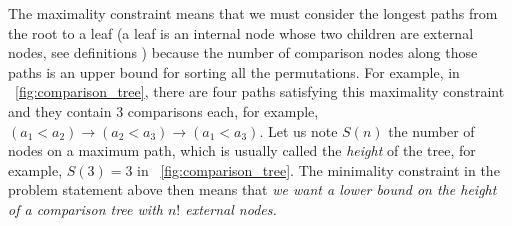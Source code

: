 The maximality constraint means that we must consider the longest
paths from the root to a leaf (a leaf is an internal node whose two
children are external nodes, see definitions )
because the number of comparison nodes along those paths is an upper
bound for sorting all the permutations. For example, in
\fig~\vref{fig:comparison_tree}, there are four paths satisfying this
maximality constraint and they contain \(3\) comparisons each, for example,
\((a_1<a_2)\rightarrow(a_2<a_3)\rightarrow(a_1<a_3)\). Let us note
\(S(n)\) the number of nodes on a maximum path, which is usually
called the \emph{height} of the tree, for example, \(S(3)=3\) in
\fig~\vref{fig:comparison_tree}. The minimality constraint in the
problem statement above then means that \emph{we want a lower bound on
  the height of a comparison tree with \(n!\) external nodes.}


